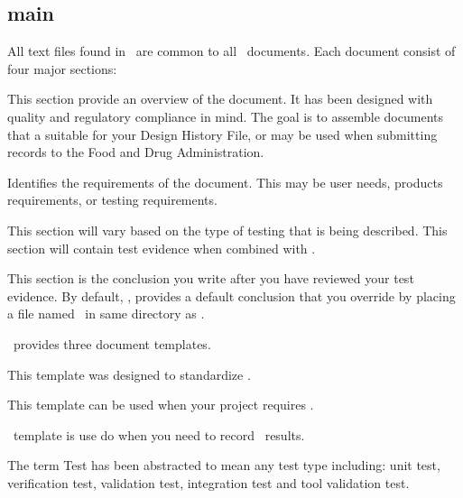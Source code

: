 \subsection{main}
All text files found in \adBoilerplate\ are common to all \adAutoDoc\ documents.
Each document consist of four major sections:

\begin{description}[leftmargin=3cm, style=nextline]
  \item[Overview:] This section provide an overview of the document.  It has
    been designed with quality and regulatory compliance in mind.  The goal is
    to assemble documents that a suitable for your Design History File, or may
    be used when submitting records to the Food and Drug Administration.

  \item[Requirements:] Identifies the requirements of the document.  This may be
    user needs, products requirements, or testing requirements.

  \item[Test Plan Overview:] This section will vary based on the type of testing
    that is being described.  This section will contain test evidence when
    combined with \adAmber.

  \item[Conclusion:] This section is the conclusion you write after you have
    reviewed your test evidence.  By default, \adAutoDoc, provides a default
    conclusion that you override by placing a file named \adConclusion\ in same
    directory as \adStarterkit.

\end{description}

\adAutoDoc\ provides three document templates.

\begin{description}[leftmargin=3cm, style=nextline]
  \item[\adToolTest:] This template was designed to standardize
    \adToolTestTemplate.

  \item[\adUnitTest:] This template can be used when your project requires
    \adUnitTestTemplate.

  \item[\adVerTest:] \adVerTestTemplate\ template is use do when you need to
    record \adUnitTestTemplate\ results.

\end{description}

The term Test has been abstracted to mean any test type including: unit test,
verification test, validation test, integration test and tool validation test.

